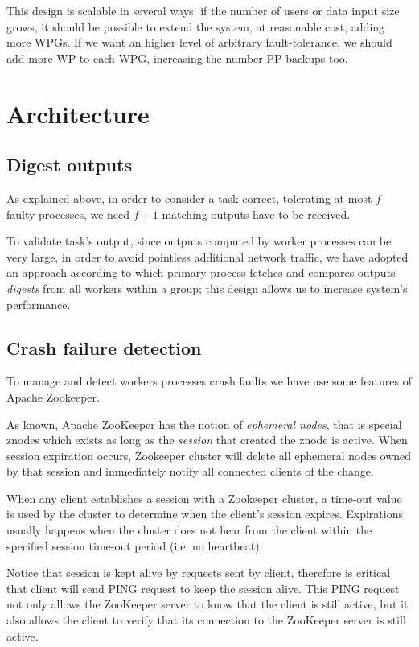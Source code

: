 \documentclass[sigchi]{acmart}
\begin{document}
This design is scalable in several ways: if the number of users or data input size grows, it should be possible to extend the system, at reasonable cost, adding more WPGs. If we want an higher level of arbitrary fault-tolerance, we should add more WP to each WPG, increasing the number PP backups too.

\section{Architecture }








\subsection{Digest outputs} As explained above, in order to consider a task correct, tolerating at most $f$ faulty processes, we need $f + 1$ matching outputs have to be received. 

To validate task's output, since outputs computed by worker processes can be very large, in order to avoid pointless additional network traffic, we have adopted an approach according to which primary process fetches and compares outputs \textit{digests} from all workers within a group; this design allows us to increase system's performance.

\subsection{Crash failure detection} To manage and detect workers processes crash faults we have use some features of Apache Zookeeper. 

As known, Apache ZooKeeper has the notion of \textit{ephemeral nodes}, that is special znodes which exists as long as the \textit{session} that created the znode is active. When session expiration occurs, Zookeeper cluster will delete all ephemeral nodes owned by that session and immediately notify all connected clients of the change.

When any client establishes a session with a Zookeeper cluster, a time-out value is used by the cluster to determine when the client's session expires. Expirations usually happens when the cluster does not hear from the client within the specified session time-out period (i.e. no heartbeat).

Notice that session is kept alive by requests sent by client, therefore is critical that client will send PING request to keep the session alive. This PING request not only allows the ZooKeeper server to know that the client is still active, but it also allows the client to verify that its connection to the ZooKeeper server is still active.
\end{document}
